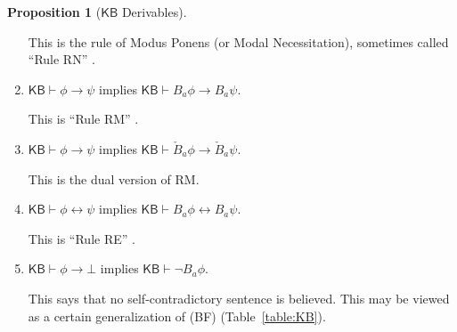 \documentclass[12pt]{article}
\theoremstyle{definition}
\newtheorem{proposition}[theorem]{Proposition}
\newcommand{\KB}{{\mathsf{KB}}}                        %
\begin{document}
\begin{proposition}[$\KB$ Derivables]
\begin{enumerate}
    This is the rule of Modus Ponens (or Modal Necessitation),
    sometimes called ``Rule RN'' \cite[Ch.~8]{Chellas:ml}.

  \item $\KB\vdash\phi\to\psi$ implies $\KB\vdash B_a\phi\to B_a\psi$.
    \label{derivables:Bimp}

    This is ``Rule RM'' \cite[Ch.~8]{Chellas:ml}.

  \item $\KB\vdash\phi\to\psi$ implies $\KB\vdash\check
    B_a\phi\to\check B_a\psi$.
    \label{derivables:check-Bimp}
    
    This is the dual version of RM.
    
  \item $\KB\vdash\phi\leftrightarrow\psi$ implies
    $\KB\vdash B_a\phi\leftrightarrow B_a\psi$.
    \label{derivables:RE}

    This is ``Rule RE'' \cite[Ch.~8]{Chellas:ml}.

  \item $\KB\vdash\phi\to\bot$ implies $\KB\vdash\lnot
    B_a\phi$. \label{derivables:GBF}

    This says that no self-contradictory sentence is believed.  This
    may be viewed as a certain generalization of (BF)
    (Table~\ref{table:KB}).
  \end{enumerate}
\end{proposition}
\end{document}
